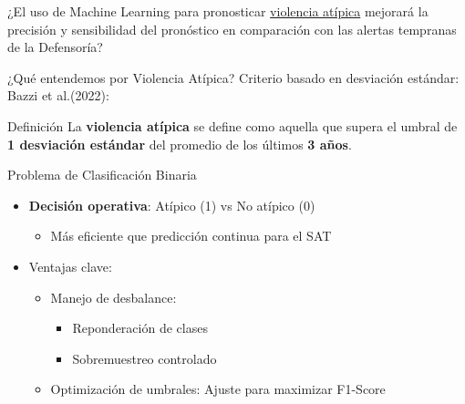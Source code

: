 

\begin{frame}{}
    \vspace{3cm}
    \centering
    \Large ¿El uso de Machine Learning para pronosticar \hyperlink{violenciaatipica}{\alert{violencia atípica}} mejorará la
    \alert{precisión y sensibilidad} del pronóstico en comparación con las alertas tempranas de la Defensoría? 

\end{frame}

\begin{frame}{¿Qué entendemos por Violencia Atípica?}
     Criterio basado en \alert{desviación estándar}: Bazzi et al.(2022):
        \begin{block}{Definición}
        La \textbf{violencia atípica} se define como aquella que supera el umbral de 
        \textbf{1 desviación estándar} del promedio de los últimos \textbf{3 años}.
    \end{block}
\end{frame}

\begin{frame}{Problema de Clasificación Binaria}
    \begin{itemize}
        \item \textbf{Decisión operativa}: Atípico (1) vs No atípico (0)
        \begin{itemize}
            \item Más eficiente que predicción continua para el SAT
        \end{itemize}
        
        \item \alert{Ventajas clave}:
        \begin{itemize}
            \item Manejo de desbalance:
            \begin{itemize}
                \item Reponderación de clases
                \item Sobremuestreo controlado
            \end{itemize}
            
            \item Optimización de umbrales: Ajuste para maximizar F1-Score
        \end{itemize}
        
    \end{itemize}
\end{frame}

